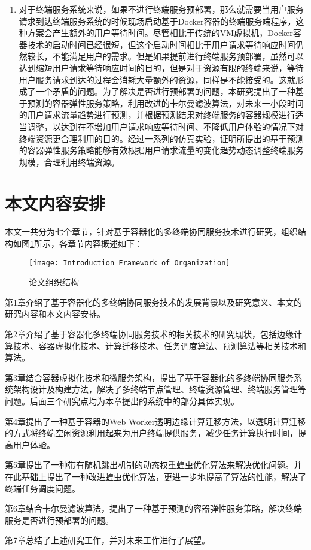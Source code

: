 \begin{enumerate}
    \item 对于终端服务系统来说，如果不进行终端服务预部署，那么就需要当用户服务请求到达终端服务系统的时候现场启动基于Docker容器的终端服务端程序，这种方案会产生额外的用户等待时间。尽管相比于传统的VM虚拟机，Docker容器技术的启动时间已经很短，但这个启动时间相比于用户请求等待响应时间仍然较长，不能满足用户的需求。但是如果提前进行终端服务预部署，虽然可以达到缩短用户请求等待响应时间的目的，但是对于资源有限的终端来说，等待用户服务请求到达的过程会消耗大量额外的资源，同样是不能接受的。这就形成了一个矛盾的问题。为了解决是否进行预部署的问题，本研究提出了一种基于预测的容器弹性服务策略，利用改进的卡尔曼滤波算法，对未来一小段时间的用户请求流量趋势进行预测，并根据预测结果对终端服务的容器规模进行适当调整，以达到在不增加用户请求响应等待时间、不降低用户体验的情况下对终端资源更合理利用的目的。经过一系列的仿真实验，证明所提出的基于预测的容器弹性服务策略能够有效根据用户请求流量的变化趋势动态调整终端服务规模，合理利用终端资源。
\end{enumerate}
\section{本文内容安排}
本文一共分为七个章节，针对基于容器化的多终端协同服务技术进行研究，组织结构如图\ref{fig:introduction_framework_of_organization}所示，各章节内容概述如下：
\begin{figure}[!htbp]
    \centering
    \texttt{[image: Introduction\_Framework\_of\_Organization]}
    \caption{论文组织结构}
    \label{fig:introduction_framework_of_organization}
\end{figure}


第1章介绍了基于容器化的多终端协同服务技术的发展背景以及研究意义、本文的研究内容和本文内容安排。

第2章介绍了基于容器化多终端协同服务技术的相关技术的研究现状，包括边缘计算技术、容器虚拟化技术、计算迁移技术、任务调度算法、预测算法等相关技术和算法。

第3章结合容器虚拟化技术和微服务架构，提出了基于容器化的多终端协同服务系统架构设计及构建方法，解决了多终端节点管理、终端资源管理、终端服务管理等问题。后面三个研究点均为本章提出的系统中的部分具体实现。

第4章提出了一种基于容器的Web Worker透明边缘计算迁移方法，以透明计算迁移的方式将终端空闲资源利用起来为用户终端提供服务，减少任务计算执行时间，提高用户体验。

第5章提出了一种带有随机跳出机制的动态权重蝗虫优化算法来解决优化问题。并在此基础上提出了一种改进蝗虫优化算法，更进一步地提高了算法的性能，解决了终端任务调度问题。

第6章结合卡尔曼滤波算法，提出了一种基于预测的容器弹性服务策略，解决终端服务是否进行预部署的问题。

第7章总结了上述研究工作，并对未来工作进行了展望。

